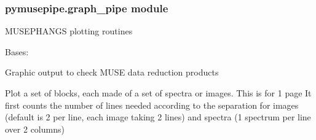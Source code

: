 \documentclass[letterpaper,10pt,english]{sphinxmanual}
\begin{document}
\subsubsection{pymusepipe.graph\_pipe module}
\label{\detokenize{api/pymusepipe:module-pymusepipe.graph_pipe}}\label{\detokenize{api/pymusepipe:pymusepipe-graph-pipe-module}}
\sphinxAtStartPar
MUSE\sphinxhyphen{}PHANGS plotting routines

\begin{fulllineitems}
\label{\detokenize{api/pymusepipe:pymusepipe.graph_pipe.GraphMuse}}
\pysigstartsignatures
{}
\pysigstopsignatures
\sphinxAtStartPar
Bases: 

\sphinxAtStartPar
Graphic output to check MUSE data reduction products

\begin{fulllineitems}
\label{\detokenize{api/pymusepipe:pymusepipe.graph_pipe.GraphMuse.close}}
\pysigstartsignatures
{}
\pysigstopsignatures
\end{fulllineitems}


\begin{fulllineitems}
\label{\detokenize{api/pymusepipe:pymusepipe.graph_pipe.GraphMuse.plot_page}}
\pysigstartsignatures
{}
\pysigstopsignatures
\sphinxAtStartPar
Plot a set of blocks, each made of a set of spectra or
images. This is for 1 page
It first counts the number of lines needed according to the
separation for images (default is 2 per line, each image taking 2 lines)
and spectra (1 spectrum per line over 2 columns)


\end{fulllineitems}
\end{fulllineitems}
\end{document}
